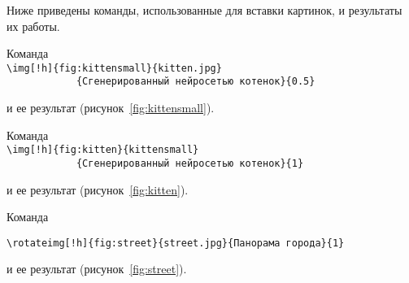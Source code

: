 Ниже приведены команды, использованные для вставки картинок, и результаты их
работы. 

Команда\\
\lstinline$\img[!h]{fig:kittensmall}{kitten.jpg}$\\
\lstinline$            {Сгенерированный нейросетью котенок}{0.5}$

и ее результат (рисунок~\ref{fig:kittensmall}).


\newpage
Команда\\
\lstinline$\img[!h]{fig:kitten}{kittensmall}$\\
\lstinline$            {Сгенерированный нейросетью котенок}{1}$

и ее результат (рисунок~\ref{fig:kitten}).


Команда 

\lstinline$\rotateimg[!h]{fig:street}{street.jpg}{Панорама города}{1}$

и ее результат (рисунок~\ref{fig:street}).
\newpage
{}
\clearpage